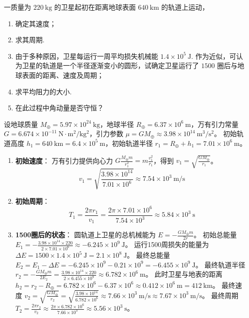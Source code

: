 \begin{exercise}\label{ex:4.5}
一质量为 $220 \ \mathrm{kg}$ 的卫星起初在距离地球表面 $640 \ \mathrm{km}$ 的轨道上运动，
\begin{enumerate}
  \item[(a)] 确定其速度；
  \item[(b)] 求其周期.
  \item[(c)] 由于多种原因，卫星每运行一周平均损失机械能 $1.4 \times 10^5 \ \mathrm{J}$. 作为近似，可认为卫星的轨道是一个半径逐渐变小的圆形，试确定卫星运行了 $1500$ 圈后与地球表面的距离、速度及周期；
  \item[(d)] 求平均阻力的大小.
  \item[(e)] 在此过程中角动量是否守恒？
\end{enumerate}
\end{exercise}
\begin{solution}
设地球质量 $M_\oplus = 5.97 \times 10^{24} \ \mathrm{kg}$，地球半径 $R_\oplus = 6.37 \times 10^6 \ \mathrm{m}$，万有引力常量 $G = 6.674 \times 10^{-11} \ \mathrm{N \cdot m^2 / kg^2}$，引力参数 $\mu = GM_\oplus \approx 3.98 \times 10^{14} \ \mathrm{m^3/s^2}$。
初始轨道高度 $h_1 = 640 \ \mathrm{km} = 6.4 \times 10^5 \ \mathrm{m}$，初始轨道半径 $r_1 = R_\oplus + h_1 = 7.01 \times 10^6 \ \mathrm{m}$。

\begin{enumerate}
    \item[(a)] \textbf{初始速度}：
    万有引力提供向心力 $G \frac{M_\oplus m}{r_1^2} = m \frac{v_1^2}{r_1}$，得到 $v_1 = \sqrt{\frac{GM_\oplus}{r_1}}$。
    $$ v_1 = \sqrt{\frac{3.98 \times 10^{14}}{7.01 \times 10^6}} \approx 7.54 \times 10^3 \ \mathrm{m/s} $$

    \item[(b)] \textbf{初始周期}：
    $$ T_1 = \frac{2\pi r_1}{v_1} = \frac{2\pi \times 7.01 \times 10^6}{7.54 \times 10^3} \approx 5.84 \times 10^3 \ \mathrm{s} $$

    \item[(c)] \textbf{1500圈后的状态}：
    圆轨道上卫星的总机械能为 $E = -\frac{GM_\oplus m}{2r}$。
    初始总能量 $E_1 = -\frac{3.98 \times 10^{14} \times 220}{2 \times 7.01 \times 10^6} \approx -6.245 \times 10^9 \ \mathrm{J}$。
    运行1500周损失的能量为 $\Delta E = 1500 \times 1.4 \times 10^5 \ \mathrm{J} = 2.1 \times 10^8 \ \mathrm{J}$。
    最终总能量 $E_2 = E_1 - \Delta E = -6.245 \times 10^9 - 0.21 \times 10^9 = -6.455 \times 10^9 \ \mathrm{J}$。
    最终轨道半径 $r_2 = -\frac{GM_\oplus m}{2E_2} = \frac{3.98 \times 10^{14} \times 220}{2 \times 6.455 \times 10^9} \approx 6.782 \times 10^6 \ \mathrm{m}$。
    此时卫星与地表的距离 $h_2 = r_2 - R_\oplus = 6.782 \times 10^6 - 6.37 \times 10^6 \approx 0.412 \times 10^6 \ \mathrm{m} = 412 \ \mathrm{km}$。
    最终速度 $v_2 = \sqrt{\frac{GM_\oplus}{r_2}} = \sqrt{\frac{3.98 \times 10^{14}}{6.782 \times 10^6}} \approx 7.66 \times 10^3 \ \mathrm{m/s} \approx 7.67 \times 10^3 \ \mathrm{m/s}$。
    最终周期 $T_2 = \frac{2\pi r_2}{v_2} \approx \frac{2\pi \times 6.782 \times 10^6}{7.66 \times 10^3} \approx 5.56 \times 10^3 \ \mathrm{s}$。


\end{enumerate}
\end{solution}
